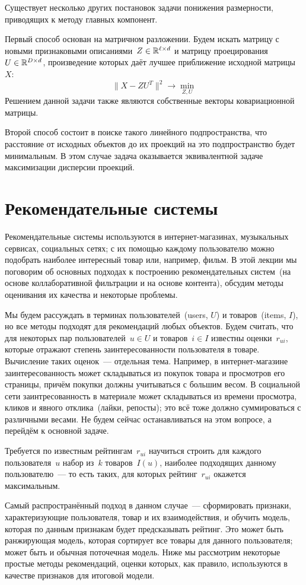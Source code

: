 \documentclass[12pt,fleqn]{article}
\begin{document}
Существует несколько других постановок задачи понижения размерности,
приводящих к методу главных компонент.

Первый способ основан на матричном разложении.
Будем искать матрицу с новыми признаковыми описаниями~$Z \in \RR^{\ell \times d}$
и матрицу проецирования~$U \in \RR^{D \times d}$,
произведение которых даёт лучшее приближение исходной матрицы~$X$:
\[
    \| X - Z U^T \|^2
    \to
    \min_{Z, U}
\]
Решением данной задачи также являются собственные векторы ковариационной матрицы.

Второй способ состоит в поиске такого линейного подпространства,
что расстояние от исходных объектов до их проекций на это подпространство
будет минимальным.
В этом случае задача оказывается эквивалентной задаче максимизации дисперсии проекций.

\section{Рекомендательные системы}
Рекомендательные системы используются в интернет-магазинах, музыкальных сервисах,
социальных сетях; с их помощью каждому пользователю можно подобрать наиболее интересный
товар или, например, фильм.
В этой лекции мы поговорим об основных подходах к построению рекомендательных систем~(на основе
коллаборативной фильтрации и на основе контента), обсудим методы оценивания их качества
и некоторые проблемы.

Мы будем рассуждать в терминах пользователей~(users, $U$) и товаров~(items, $I$),
но все методы подходят для рекомендаций любых объектов.
Будем считать, что для некоторых пар пользователей~$u \in U$ и товаров~$i \in I$ известны
оценки~$r_{ui}$, которые отражают степень заинтересованности пользователя в товаре.
Вычисление таких оценок~--- отдельная тема.
Например, в интернет-магазине заинтересованность может складываться из покупок товара
и просмотров его страницы, причём покупки должны учитываться с большим весом.
В социальной сети заинтресованность в материале может складываться из времени просмотра,
кликов и явного отклика~(лайки, репосты); это всё тоже должно суммироваться с различными весами.
Не будем сейчас останавливаться на этом вопросе, а перейдём к основной задаче.

Требуется по известным рейтингам~$r_{ui}$ научиться строить для каждого пользователя~$u$
набор из~$k$ товаров~$I(u)$, наиболее подходящих данному пользователю~--- то есть таких,
для которых рейтинг~$r_{ui}$ окажется максимальным.

Самый распространённый подход в данном случае~--- сформировать признаки, характеризующие пользователя, товар и их взаимодействия,
и обучить модель, которая по данным признакам будет предсказывать рейтинг.
Это может быть ранжирующая модель, которая сортирует все товары для данного пользователя; может быть и обычная поточечная модель.
Ниже мы рассмотрим некоторые простые методы рекомендаций, оценки которых, как правило, используются в качестве
признаков для итоговой модели.
\end{document}
